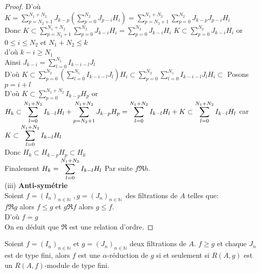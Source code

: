 \begin{proof}
	D'où $K=\displaystyle  \sum_{p=N_{2}+1}^{N_{1}+N_{2}}J_{k-p}(\displaystyle  \sum_{p=0}^{N_{2}}J_{p-i}H_{i})=\displaystyle  \sum_{p=N_{2}+1}^{N_{1}+N_{2}}\displaystyle  \sum_{p=0}^{N_{2}}J_{k-p}J_{p-i}H_{i}$ \\
	Donc $K\subset\displaystyle  \sum_{p=N_{2}+1}^{N_{1}+N_{2}}\displaystyle  \sum_{p=0}^{N_{2}}J_{k-i}H_{i}=\displaystyle  \sum_{p=0}^{N_{2}}J_{k-i}H_{i}$
	$K\subset \displaystyle  \sum_{p=0}^{N_{2}}J_{k-i}H_{i}$
	or $0\leq i\leq N_{2}$ et $N_{1}+N_{2}\leq k$ \\
	d'où $k-i\geq N_{1}$ \\
	Ainsi $J_{k-i}=\displaystyle  \sum_{l=0}^{N_{1}}I_{k-i-l}J_{l}$ \\
	D'où $K\subset\displaystyle  \sum_{p=0}^{N_{2}}(\displaystyle  \sum_{l=0}^{N_{1}}I_{k-i-l}J_{l})H_{i}\subset\displaystyle  \sum_{p=0}^{N_{2}}\displaystyle  \sum_{l=0}^{N_{1}}I_{k-i-l}J_{l}H_{i}\subset $
	Posons $p=i+l$ \\
	D'où $K\subset \displaystyle  \sum_{p=0}^{N_{1}+N_{2}}I_{k-p}H_{p}$
	or $H_{k}\subset
	\displaystyle  \sum_{l=0}^{N_{1}+N_{2}}I_{k-l}H_{l}+\displaystyle  \sum_{p=N_{2}+1}^{N_{1}+N_{2}}J_{k-p}H_{p}=\displaystyle  \sum_{l=0}^{N_{1}+N_{2}}I_{k-l}H_{l}+K\subset \displaystyle  \displaystyle  \sum_{l=0}^{N_{1}+N_{2}}I_{k-l}H_{l}$ car $K\subset \displaystyle  \displaystyle  \sum_{l=0}^{N_{1}+N_{2}}I_{k-l}H_{l}$ \\
	Donc $H_{k}\subset H_{k-p}H_{p}\subset H_{k}$ \\
	Finalement $H_{k}=\displaystyle  \displaystyle  \sum_{l=0}^{N_{1}+N_{2}}I_{k-l}H_{l}$
	Par suite $f \Re h$. \\
	
	(iii) \textbf{Anti-symétrie} \\
	Soient $f=(I_{n})_{n\in \mathbb{N}}$ $,g=(J_{n})_{n\in \mathbb{N} }$\ des filtrations de $A$ telles que: \\
	$f \Re g$ alors $f\leq g$ et $g \Re f$ alors $g\leq f.$ \\
	D'où $f=g$ \\
	On en déduit que $\Re$ est une relation d'ordre. 
\end{proof}
\begin{maproposition}
	Soient $f=(I_n)_{n \in \mathbb{N}}$ et $g=(J_n)_{n \in \mathbb{N}}$ deux filtrations de $A$. $f \geq g$ et chaque $J_n$ est de type fini, alors $f$ est une $\alpha$-réduction de $g$ si et seulement si $R(A,g)$ est un $R(A,f)$-module de type fini.
\end{maproposition}

